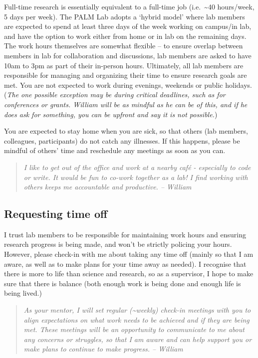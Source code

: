 \documentclass[
]{book}
\begin{document}
Full-time research is essentially equivalent to a full-time job (i.e.~\textasciitilde40 hours/week, 5 days per week). The PALM Lab adopts a `hybrid model' where lab members are expected to spend at least three days of the week working on campus/in lab, and have the option to work either from home or in lab on the remaining days. The work hours themselves are somewhat flexible -- to ensure overlap between members in lab for collaboration and discussions, lab members are asked to have 10am to 3pm as part of their in-person hours. Ultimately, all lab members are responsible for managing and organizing their time to ensure research goals are met. You are not expected to work during evenings, weekends or public holidays. (\emph{The one possible exception may be during critical deadlines, such as for conferences or grants. William will be as mindful as he can be of this, and if he does ask for something, you can be upfront and say it is not possible.})

You are expected to stay home when you are sick, so that others (lab members, colleagues, participants) do not catch any illnesses. If this happens, please be mindful of others' time and reschedule any meetings as soon as you can.

\begin{quote}
\emph{I like to get out of the office and work at a nearby café - especially to code or write. It would be fun to co-work together as a lab! I find working with others keeps me accountable and productive. -- William}
\end{quote}

\hypertarget{requesting-time-off}{%
\subsection*{Requesting time off}\label{requesting-time-off}}

I trust lab members to be responsible for maintaining work hours and ensuring research progress is being made, and won't be strictly policing your hours. However, please check-in with me about taking any time off (mainly so that I am aware, as well as to make plans for your time away as needed). I recognise that there is more to life than science and research, so as a supervisor, I hope to make sure that there is balance (both enough work is being done and enough life is being lived.)

\begin{quote}
\emph{As your mentor, I will set regular (\textasciitilde weekly) check-in meetings with you to align expectations on what work needs to be achieved and if they are being met. These meetings will be an opportunity to communicate to me about any concerns or struggles, so that I am aware and can help support you or make plans to continue to make progress. -- William}
\end{quote}
\end{document}
